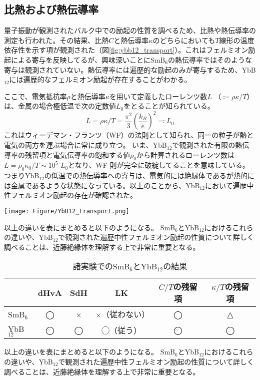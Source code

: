 \subsection{比熱および熱伝導率}
量子振動が観測されたバルク中での励起の性質を調べるため、比熱や熱伝導率の測定も行われた。その結果、比熱$C$と熱伝導率$\kappa$のどちらにおいても$T$線形の温度依存性を示す項が観測された（図\ref{fig:ybb12_transport}）。これはフェルミオン励起による寄与を反映してるが、興味深いことにSmB$_6$の熱伝導率ではそのような寄与は観測されていない。熱伝導率には遍歴的な励起のみが寄与するため、YbB$_{12}$には遍歴的なフェルミオン励起が存在することがわかる。\par
ここで、電気抵抗率$\rho$と熱伝導率$\kappa$を用いて定義したローレンツ数$L$ $（\coloneqq{\rho\kappa/T}）$は、金属の場合極低温で次の定数値$L_0$をとることが知られている。
$$
L=\rho\kappa/T=\frac{\pi^2}{3}\left(\frac{k_B}{e}\right)^2\eqqcolon{L_0}
$$
これはウィーデマン・フランツ（WF）の法則として知られ、同一の粒子が熱と電気の両方を運ぶ場合に常に成り立つ。
いま、YbB$_{12}$で観測された有限の熱伝導率の残留項と電気伝導率の飽和する値$\rho_0$から計算されるローレンツ数は$L=\rho_0\kappa_0/T\sim10^5$ $L_0$となり、WF
則が完全に破綻してることを意味している。つまりYbB$_{12}$の低温での熱伝導率への寄与は、電気的には絶縁体であるが熱的には金属であるような状態になっている。以上のことから、YbB$_{12}$において遍歴中性フェルミオン励起の存在が確認された。
\begin{figure*}[!thb]
	\begin{center}
		\texttt{[image: Figure/YbB12\_transport.png]}
\caption{YbB$_{12}$に対する（A）比熱測定と（B）熱伝導率の結果\cite{sato2019unconventional}。SmB$_6$と異なりどちらの物理量でもフェルミオンの寄与を示す温度の線形項が観測されている。特に熱伝導率における温度の線形項は、遍歴的なフェルミオン励起の存在を示す。}
\label{fig:ybb12_transport}
    \end{center}
\end{figure*}


以上の違いを表にまとめると以下のようになる。
SmB$_6$とYbB$_{12}$におけるこれらの違いや、YbB$_{12}$で観測された遍歴中性フェルミオン励起の性質について詳しく調べることは、近藤絶縁体を理解する上で非常に重要となる。

\begin{table}[htb]
  \begin{center}
    \caption{諸実験でのSmB$_6$とYbB$_{12}$の結果}
    \begin{tabular}{|l||c|c|c|c|c|} \hline
       & dHvA & SdH & LK & $C/T$の残留項 & $\kappa/T$の残留項 \\ \hline \hline
      SmB$_6$ & ◯ & × & ×（従わない） & ◯ & △ \\
      YbB$_{12}$ & ◯ & ◯ & ◯（従う）& ◯ & ◯ \\ \hline
    \end{tabular}
    \label{tab:difference}
  \end{center}
\end{table}



以上の違いを表にまとめると以下のようになる。
SmB$_6$とYbB$_{12}$におけるこれらの違いや、YbB$_{12}$で観測された遍歴中性フェルミオン励起の性質について詳しく調べることは、近藤絶縁体を理解する上で非常に重要となる。
